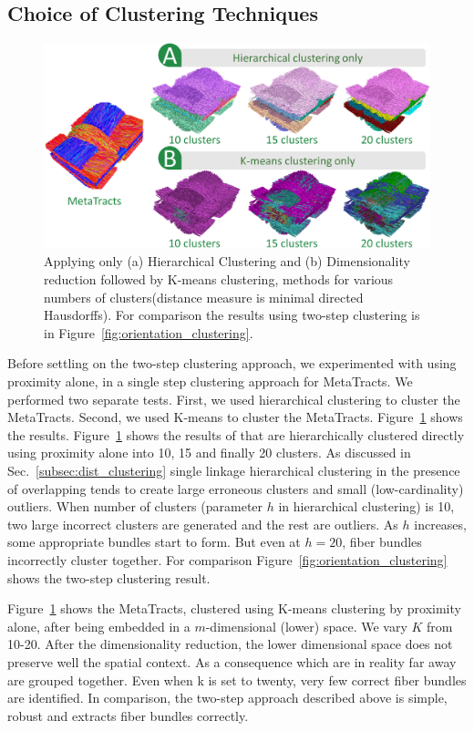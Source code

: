 \subsection{Choice of Clustering Techniques}\label{subsec:clus_choice}
\begin{figure}[htb]
	\centering
	\includegraphics[width=\linewidth]{images/comparison_all.eps}
	\caption{Applying only (a) Hierarchical Clustering and (b) Dimensionality reduction followed by K-means clustering, methods for various numbers of clusters(distance measure is minimal directed Hausdorffs).
		For comparison the results using two-step clustering is in Figure~\ref{fig:orientation_clustering}.}
	\label{fig:comparison}
\end{figure} 
Before settling on the two-step clustering approach, we experimented with using proximity alone, in a single step clustering approach for MetaTracts. We performed two separate tests. First, we used hierarchical clustering to cluster the MetaTracts. Second, we used K-means to cluster the MetaTracts.
Figure~\ref{fig:comparison} shows the results. Figure~\ref{fig:comparison} shows the results of \mt that are hierarchically clustered directly using proximity alone into 10, 15 and finally 20 clusters. 
As discussed in Sec.~\ref{subsec:dist_clustering} single linkage hierarchical clustering in the presence of overlapping \mt tends to create large erroneous clusters and small (low-cardinality) outliers.
When number of clusters (parameter $h$ in hierarchical clustering) is 10, two large incorrect clusters are generated and the rest are outliers. As $h$ increases, some appropriate bundles start to form. But even at $h=20$, fiber bundles incorrectly cluster together. For comparison Figure~\ref{fig:orientation_clustering} shows the two-step clustering result. 


Figure~\ref{fig:comparison} shows the MetaTracts, clustered using K-means clustering by proximity alone, after being embedded in a $m$-dimensional (lower) space. We vary $K$ from 10-20. After the dimensionality reduction, the lower dimensional space does not preserve well the spatial context. As a consequence \mt which are in reality far away are grouped together. Even when k is set to twenty, very few correct fiber bundles are identified.  In comparison, the two-step approach described above is simple, robust and extracts fiber bundles correctly.
